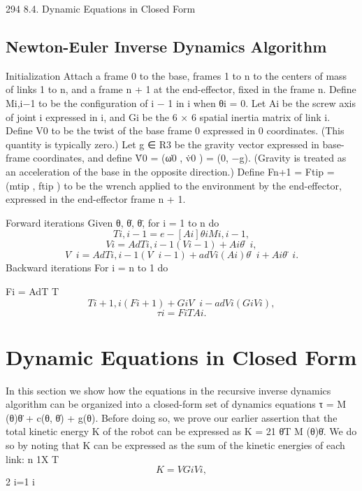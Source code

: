 \documentclass[12pt,a4paper]{article}
\begin{document}
294                                                    8.4. Dynamic Equations in Closed Form

\subsection{Newton-Euler Inverse Dynamics Algorithm}
Initialization Attach a frame {0} to the base, frames {1} to {n} to the centers
of mass of links {1} to {n}, and a frame {n + 1} at the end-effector, fixed in the
frame {n}. Define Mi,i−1 to be the configuration of {i − 1} in {i} when θi = 0.
Let Ai be the screw axis of joint i expressed in {i}, and Gi be the 6 × 6 spatial
inertia matrix of link i. Define V0 to be the twist of the base frame {0} expressed
in {0} coordinates. (This quantity is typically zero.) Let g ∈ R3 be the gravity
vector expressed in base-frame coordinates, and define V̇0 = (ω̇0 , v̇0 ) = (0, −g).
(Gravity is treated as an acceleration of the base in the opposite direction.)
Define Fn+1 = Ftip = (mtip , ftip ) to be the wrench applied to the environment
by the end-effector, expressed in the end-effector frame {n + 1}.

Forward iterations Given θ, θ̇, θ̈, for i = 1 to n do
\begin{equation}
Ti,i−1      = e−[Ai ]θi Mi,i−1 ,
\label{eq:8.50}
\end{equation}
\begin{equation}
Vi     =     AdTi,i−1 (Vi−1 ) + Ai θ̇i ,
\label{eq:8.51}
\end{equation}
\begin{equation}
V̇i    =     AdTi,i−1 (V̇i−1 ) + adVi (Ai )θ̇i + Ai θ̈i .
\label{eq:8.52}
\end{equation}
Backward iterations For i = n to 1 do

                      Fi       =    AdT                           T
\begin{equation}
Ti+1,i (Fi+1 ) + Gi V̇i − adVi (Gi Vi ),
\label{eq:8.53}
\end{equation}
\begin{equation}
τi      = FiT Ai .
\label{eq:8.54}
\end{equation}
\section{Dynamic Equations in Closed Form}
In this section we show how the equations in the recursive inverse dynamics
algorithm can be organized into a closed-form set of dynamics equations τ =
M (θ)θ̈ + c(θ, θ̇) + g(θ).
   Before doing so, we prove our earlier assertion that the total kinetic energy
K of the robot can be expressed as K = 21 θ̇T M (θ)θ̇. We do so by noting that K
can be expressed as the sum of the kinetic energies of each link:
                                                   n
                                               1X T
\begin{equation}
K=         V Gi Vi ,
\label{eq:8.55}
\end{equation}
                                               2 i=1 i
\end{document}
